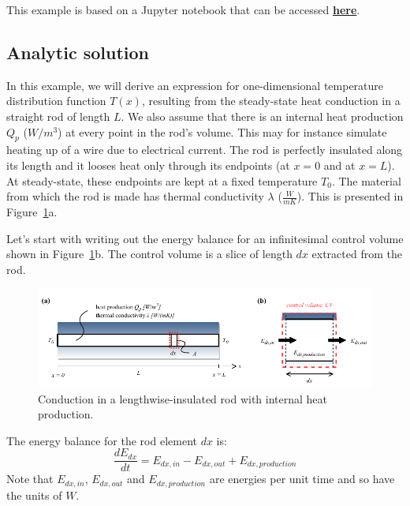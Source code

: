 This example is based on a Jupyter notebook that can be accessed \href{https://github.com/camillejr/fluid-dynamics-and-transport-phenomena/blob/master/transport-phenomena-with-Python/code/01-heat-conduction.ipynb}{\textbf{here}}.

\subsection{Analytic solution}

In this example, we will derive an expression for one-dimensional temperature distribution function $T(x)$, resulting from the steady-state heat conduction in a straight rod of length $L$. We also assume that there is an internal heat production $Q_p$ ($W/m^3$) at every point in the rod's volume. This may for instance simulate heating up of a wire due to electrical current. The rod is perfectly insulated along its length and it looses heat only through its endpoints (at $x=0$ and at $x=L$). At steady-state, these endpoints are kept at a fixed temperature $T_0$. The material from which the rod is made has thermal conductivity $\lambda$ ($\frac{W}{mK}$). This is presented in Figure~\ref{fig:heat-transfer-in-a-rod-theory}a.

Let's start with writing out the energy balance for an infinitesimal control volume shown in Figure~\ref{fig:heat-transfer-in-a-rod-theory}b. The control volume is a slice of length $dx$ extracted from the rod.
\begin{figure}[H]
\centering\includegraphics[width=16cm]{figures/example-heat-transfer-in-a-rod-theory.pdf}
\caption{Conduction in a lengthwise-insulated rod with internal heat production.}
\label{fig:heat-transfer-in-a-rod-theory}
\end{figure}
The energy balance for the rod element $dx$ is:
\begin{equation}
\frac{dE_{dx}}{dt} = E_{dx, in} - E_{dx, out} + E_{dx, production}
\end{equation}
Note that $E_{dx, in}$, $E_{dx, out}$ and $E_{dx, production}$ are energies per unit time and so have the units of $W$.

